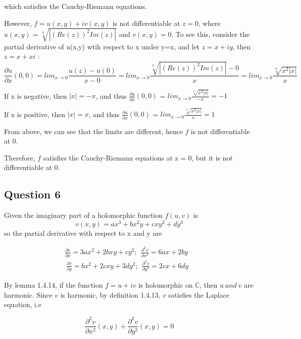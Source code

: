 \documentclass[11pt, oneside]{article}   	%
\begin{document}
which satisfies the Cauchy-Riemann equations.

However, \(f = u(x,y)+iv(x,y)\) is not differentiable at \(z = 0\), where \(u(x,y) = \sqrt[3]{|(Re(z))^2Im(z)|}\) and \(v(x,y)=0\). To see this, consider the partial derivative of u(x,y) wtih respect to x under y=x, and let \(z=x+iy\), then \(z = x+xi\) :
\begin{equation*}
  \frac{\partial{u}}{\partial{x}}(0,0) = lim_ {x \rightarrow 0} \frac{u(z) - u(0)}{x-0} = lim_{x\rightarrow 0} \frac{\sqrt[3]{|(Re(z))^2Im(z)|}-0}{x} = lim_{x\rightarrow 0} \frac{\sqrt[3]{x^2|x|}}{x} 	
\end{equation*}

If x is negative, then \(|x| = -x\), and thus \(\frac{\partial{u}}{\partial{x}}(0,0)\) = \(lim_{x\rightarrow 0} \frac{\sqrt[3]{x^2|x|}}{-x}=-1\) 	

If x is positive, then \(|x| = x\), and thus \(\frac{\partial{u}}{\partial{x}}(0,0)\) = \(lim_{x\rightarrow 0} \frac{\sqrt[3]{x^2|x|}}{x}=1\)

From above, we can see that the limits are different, hence \(f\) is not differentiable at 0. 	


Therefore, \(f\) satisfies the Cauchy-Riemann equations at z = 0, but it is not differentiable at 0.




\newpage


\subsection*{Question 6}
Given the imaginary part of a holomorphic function \(f(u,v)\) is 
	\begin{equation*}
		v(x,y) = ax^3+bx^2y+cxy^2+dy^3
	\end{equation*} 
so the partial derivative with respect to x and y are

\begin{align*}
  \frac{\partial{v}}{\partial{x}} = 3ax^2+2bxy+cy^2 ; \  \ \frac{\partial^2{v}}{\partial{x}^2} = 6ax+2by
  &
  \\
  \
  \frac{\partial{v}}{\partial{y}} = bx^2+2cxy+3dy^2; \  \ \frac{\partial^2{v}}{\partial{y}^2} = 2cx+6dy
\end{align*}
	
By lemma 1.4.14, if the function \(f=u+iv\) is holomorphic on \(\mathbb{C}\), then \(u  \ and \  v\) are harmonic. Since \(v\) is harmonic, by definition 1.4.13, \(v\) satisfies the Laplace equation, i.e

\begin{equation*}
	\frac{\partial^2{v}}{\partial{x}^2}(x,y)+\frac{\partial^2{v}}{\partial{y}^2}(x,y) = 0
\end{equation*}
\end{document}
